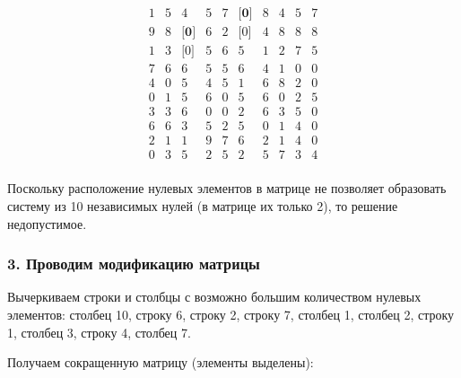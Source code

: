 \documentclass[17pt]{extarticle}
\begin{document}
\[
    \begin{array}{*{10}{c}}
        1 & 5 & 4            & 5 & 7 & \textbf{[0]} & 8 & 4 & 5 & 7 \\
        9 & 8 & \textbf{[0]} & 6 & 2 & \text{[0]}   & 4 & 8 & 8 & 8 \\
        1 & 3 & \text{[0]}   & 5 & 6 & 5            & 1 & 2 & 7 & 5 \\
        7 & 6 & 6            & 5 & 5 & 6            & 4 & 1 & 0 & 0 \\
        4 & 0 & 5            & 4 & 5 & 1            & 6 & 8 & 2 & 0 \\
        0 & 1 & 5            & 6 & 0 & 5            & 6 & 0 & 2 & 5 \\
        3 & 3 & 6            & 0 & 0 & 2            & 6 & 3 & 5 & 0 \\
        6 & 6 & 3            & 5 & 2 & 5            & 0 & 1 & 4 & 0 \\
        2 & 1 & 1            & 9 & 7 & 6            & 2 & 1 & 4 & 0 \\
        0 & 3 & 5            & 2 & 5 & 2            & 5 & 7 & 3 & 4 \\
    \end{array}
\]

Поскольку расположение нулевых элементов в матрице не позволяет образовать систему из 10 независимых нулей (в матрице их только 2), то решение недопустимое.

\subsubsection*{3. Проводим модификацию матрицы}

Вычеркиваем строки и столбцы с возможно большим количеством нулевых элементов: столбец 10, строку 6, строку 2, строку 7, столбец 1, столбец 2, строку 1, столбец 3, строку 4, столбец 7.

Получаем сокращенную матрицу (элементы выделены):
\end{document}
